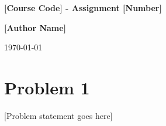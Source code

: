 \documentclass[11pt,a4paper]{article}
\begin{document}
\begin{titlepage}
\begin{center}
    
    {\huge \textbf{[Course Code] - Assignment [Number]}}
    \vspace{1cm}

    \vspace{1cm}
    {\large \textbf{[Author Name]}}
    \vspace{1cm}
    
    \vfill 
    
    {\large \today}
\end{center}
\end{titlepage}

\newcommand{\true}{\textcolor{blue}{true}}
\newcommand{\false}{\textcolor{blue}{false}}
\renewcommand{\Square}{\tikz \draw[black] (0,0) rectangle (0.21,0.21);}
\newcommand{\bluesquare}{\textcolor{blue}{\tikz \fill[blue] (0,0) rectangle (0.2,0.2);}}
\renewcommand{\Circle}{\tikz \draw[black] (0,0) circle [radius=0.16];}
\newcommand{\bluecircle}{\textcolor{blue}{\tikz\fill[blue] (0,0) circle [radius=0.15];}}

\section*{Problem 1}
[Problem statement goes here]

\vspace{5cm}

\end{document}
